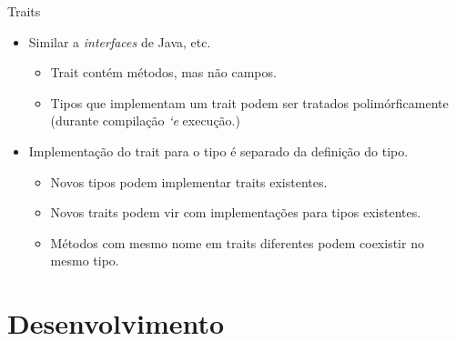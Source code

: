 \documentclass{beamer}
\begin{document}
\begin{frame}{Traits}
	\begin{itemize}
		\item Similar a \emph{interfaces} de Java, etc.
		\begin{itemize}
			\item Trait contém métodos, mas não campos.
			\item Tipos que implementam um trait podem ser tratados polimórficamente (durante compilação \emph{`e} execução.)
		\end{itemize}
		\item Implementação do trait para o tipo é separado da definição do tipo.
		\begin{itemize}
			\item Novos tipos podem implementar traits existentes.
			\item Novos traits podem vir com implementações para tipos existentes.
			\item Métodos com mesmo nome em traits diferentes podem coexistir no mesmo tipo.
		\end{itemize}
	\end{itemize}
\end{frame}


\section{Desenvolvimento}
\end{document}

